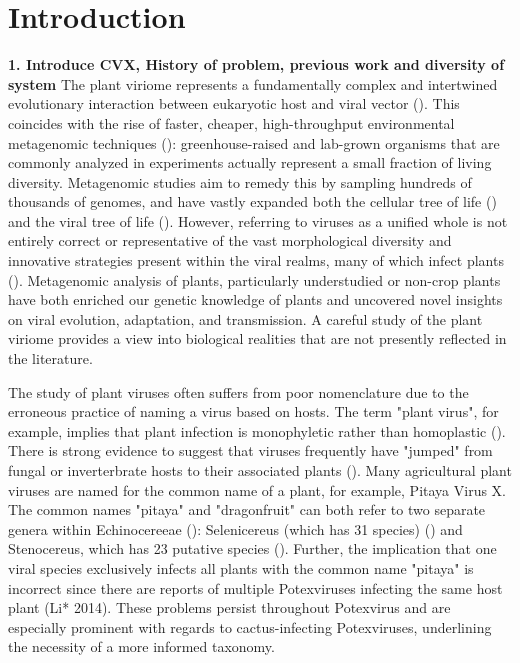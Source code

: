 \documentclass{article}
\begin{document}
\section*{Introduction}
\textbf{1. Introduce CVX, History of problem, previous work and diversity of system}
The plant viriome represents a fundamentally complex and intertwined evolutionary interaction between eukaryotic host and viral vector (\cite{delwart_viral_2007}).
 This coincides with the rise of faster, cheaper, high-throughput environmental metagenomic techniques (\cite{delwart_viral_2007, lefeuvre_evolution_2019, schulz_towards_2017}): greenhouse-raised and lab-grown organisms that are commonly analyzed in experiments actually represent a small fraction of living diversity. 
 Metagenomic studies aim to remedy this by sampling hundreds of thousands of genomes, and have vastly expanded both the cellular tree of life (\cite{schulz_towards_2017, hug_new_2016}) and the viral tree of life (\cite{gregory_marine_2019, lefeuvre_evolution_2019, shi_redefining_2016}).  
However, referring to viruses as a unified whole is not entirely correct or representative of the vast morphological diversity and innovative strategies present within the viral realms, many of which infect plants (\cite{delwart_viral_2007, lefeuvre_evolution_2019}).
 Metagenomic analysis of plants, particularly understudied or non-crop plants have both enriched our genetic knowledge of plants and uncovered novel insights on viral evolution, adaptation, and transmission. 
 A careful study of the plant viriome provides a view into biological realities that are not presently reflected in the literature.


The study of plant viruses often suffers from poor nomenclature due to the erroneous practice of naming a virus based on hosts. 
The term "plant virus", for example, implies that plant infection is monophyletic rather than homoplastic (\cite{lefeuvre_evolution_2019}). 
There is strong evidence to suggest that viruses frequently have "jumped" from fungal or inverterbrate hosts to their associated plants (\cite{lefeuvre_evolution_2019}). 
Many agricultural plant viruses are named for the common name of a plant, for example, Pitaya Virus X. 
The common names "pitaya" and "dragonfruit" can both refer to two separate genera within Echinocereeae (\cite{le_bellec_12_2011}): Selenicereus (which has 31 species) (\cite{korotkova_phylogenetic_2017, guerrero_phylogenetic_2019}) and Stenocereus, which has 23 putative species (\cite{guerrero_phylogenetic_2019}).
Further, the implication that one viral species exclusively infects all plants with the common name "pitaya" is incorrect since there are reports of multiple Potexviruses infecting the same host plant (Li* 2014). 
These problems persist throughout Potexvirus and are especially prominent with regards to cactus-infecting Potexviruses, underlining the necessity of a more informed taxonomy.
\end{document}

